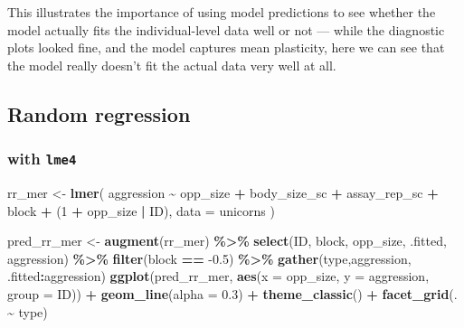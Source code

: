 \documentclass[
  12pt,
]{book}
\newenvironment{Shaded}{\begin{snugshade}}{\end{snugshade}}
\newcommand{\DataTypeTok}[1]{\textcolor[rgb]{0.13,0.29,0.53}{#1}}
\newcommand{\DecValTok}[1]{\textcolor[rgb]{0.00,0.00,0.81}{#1}}
\newcommand{\FloatTok}[1]{\textcolor[rgb]{0.00,0.00,0.81}{#1}}
\newcommand{\KeywordTok}[1]{\textcolor[rgb]{0.13,0.29,0.53}{\textbf{#1}}}
\newcommand{\NormalTok}[1]{#1}
\newcommand{\OperatorTok}[1]{\textcolor[rgb]{0.81,0.36,0.00}{\textbf{#1}}}
\newcommand{\StringTok}[1]{\textcolor[rgb]{0.31,0.60,0.02}{#1}}
\begin{document}
This illustrates the importance of using model predictions to see whether the model actually fits the individual-level data well or not --- while the diagnostic plots looked fine, and the model captures mean plasticity, here we can see that the model really doesn't fit the actual data very well at all.

\hypertarget{random-regression}{%
\subsection{Random regression}\label{random-regression}}

\hypertarget{with-lme4}{%
\subsubsection{\texorpdfstring{with \texttt{lme4}}{with lme4}}\label{with-lme4}}

\begin{Shaded}
\begin{Highlighting}[]
\NormalTok{rr\_mer \textless{}{-}}\StringTok{ }\KeywordTok{lmer}\NormalTok{(}
\NormalTok{  aggression }\OperatorTok{\textasciitilde{}}\StringTok{ }\NormalTok{opp\_size }\OperatorTok{+}\StringTok{ }\NormalTok{body\_size\_sc }\OperatorTok{+}\StringTok{ }\NormalTok{assay\_rep\_sc }\OperatorTok{+}\StringTok{ }\NormalTok{block}
  \OperatorTok{+}\StringTok{ }\NormalTok{(}\DecValTok{1} \OperatorTok{+}\StringTok{ }\NormalTok{opp\_size }\OperatorTok{|}\StringTok{ }\NormalTok{ID),}
  \DataTypeTok{data =}\NormalTok{ unicorns}
\NormalTok{)}
\end{Highlighting}
\end{Shaded}

\begin{Shaded}
\begin{Highlighting}[]
\NormalTok{pred\_rr\_mer \textless{}{-}}\StringTok{ }\KeywordTok{augment}\NormalTok{(rr\_mer) }\OperatorTok{\%\textgreater{}\%}
\StringTok{  }\KeywordTok{select}\NormalTok{(ID, block, opp\_size, .fitted, aggression) }\OperatorTok{\%\textgreater{}\%}
\StringTok{  }\KeywordTok{filter}\NormalTok{(block }\OperatorTok{==}\StringTok{ }\FloatTok{{-}0.5}\NormalTok{) }\OperatorTok{\%\textgreater{}\%}
\StringTok{  }\KeywordTok{gather}\NormalTok{(type,aggression, }\StringTok{\textasciigrave{}}\DataTypeTok{.fitted}\StringTok{\textasciigrave{}}\OperatorTok{:}\NormalTok{aggression)}
\KeywordTok{ggplot}\NormalTok{(pred\_rr\_mer, }\KeywordTok{aes}\NormalTok{(}\DataTypeTok{x =}\NormalTok{ opp\_size, }\DataTypeTok{y =}\NormalTok{ aggression, }\DataTypeTok{group =}\NormalTok{ ID)) }\OperatorTok{+}
\StringTok{  }\KeywordTok{geom\_line}\NormalTok{(}\DataTypeTok{alpha =} \FloatTok{0.3}\NormalTok{) }\OperatorTok{+}
\StringTok{  }\KeywordTok{theme\_classic}\NormalTok{() }\OperatorTok{+}
\StringTok{  }\KeywordTok{facet\_grid}\NormalTok{(. }\OperatorTok{\textasciitilde{}}\StringTok{ }\NormalTok{type)}
\end{Highlighting}
\end{Shaded}
\end{document}
